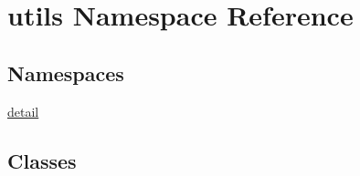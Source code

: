 \hypertarget{namespaceutils}{}\section{utils Namespace Reference}
\label{namespaceutils}
\subsection*{Namespaces}
\begin{DoxyCompactItemize}
\item 
 \mbox{\hyperlink{namespaceutils_1_1detail}{detail}}
\end{DoxyCompactItemize}
\subsection*{Classes}

